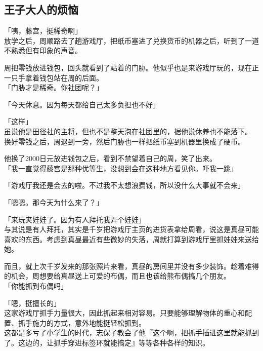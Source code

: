 \subsection{王子大人的烦恼}

「咦，藤宫，挺稀奇啊」\\

放学之后，周顺路去了趟游戏厅，把纸币塞进了兑换货币的机器之后，听到了一道不熟悉但有印象的声音。

周把零钱放进钱包，回头就看到了站着的门胁。他似乎也是来游戏厅玩的，现在正一只手拿着钱包站在周的后面。\\

「门胁才是稀奇。你社团呢？」

「今天休息。因为每天都给自己太多负担也不好」

「这样」\\

虽说他是田径社的主将，但也不是整天泡在社团里的，据他说休养也不能落下。\\

换好零钱之后，周退到一旁，然后门胁也一样把纸币塞到机器里换成了硬币。

他换了2000日元放进钱包之后，看到不禁望着自己的周，笑了出来。\\

「我一直觉得藤宫是那种优等生，没想到会在这种地方看见你。吓我一跳」

「游戏厅我还是会去的啦。不过我不太想浪费钱，所以没什么大事就不会来」

「嗯嗯。那今天为什么来了？」

「来玩夹娃娃了。因为有人拜托我弄个娃娃」\\

与其说是有人拜托，其实是千岁把游戏厅主页的进货表拿给周看，说这是真昼可能喜欢的东西。考虑到真昼最近有些微妙的失落，周就打算到游戏厅里抓娃娃来送给她。

而且，就上次千岁发来的那张照片来看，真昼的房间里并没有多少装饰。趁着难得的机会，周想要给真昼送上可爱的布偶，而且也该给熊布偶搞几个朋友。\\

「你能抓到布偶吗」

「嗯，挺擅长的」\\

这家游戏厅抓手力量很大，因此抓起来相对容易。只要能够理解物体的重心和配置、抓手施力的方式，意外地能挺轻松抓到。\\

这都是多亏了小学生的时代，志保子教会了他『这个啊，把抓手插进这里就能抓到了。这边的，让抓手穿进标签环就能搞定』等等各种各样的知识。


